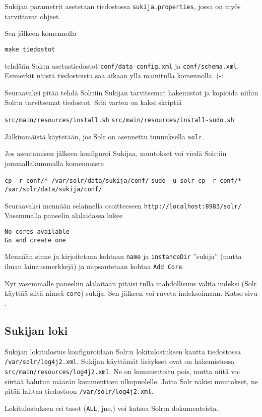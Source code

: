 \documentclass[12pt]{article}
\begin{document}
Sukijan parametrit asetetaan tiedostossa \verb|sukija.properties|,
jossa on myös tarvittavat ohjeet.

Sen jälkeen komennolla

\verb|make tiedostot|

tehdään Solr:n asetustiedostot \verb=conf/data-config.xml= ja
\verb=conf/schema.xml=. Esimerkit näistä tiedostoista
saa aikaan yllä mainitulla komennolla. (-:

Seuraavaksi pitää tehdä Solr:iin Sukijan tarvitsemat hakemistot ja
kopioida niihin Solr:n tarvitsemat tiedostot. Sitä varten on kaksi
skriptiä

\verb=src/main/resources/install.sh=
\verb=src/main/resources/install-sudo.sh=

Jälkimmäistä käytetään, jos Solr on asennettu tunnuksella \verb=solr=.

Jos asentamisen jälkeen konfiguroi Sukijaa, muutokset voi viedä
Solr:iin jommallakummalla komennoista

\verb=cp -r conf/* /var/solr/data/sukija/conf/=
\verb=sudo -u solr cp -r conf/* /var/solr/data/sukija/conf/=


Seuraavaksi mennään selaimella osoitteeseen \verb=http://localhost:8983/solr/=
Vasemmalla paneelin alalaidassa lukee 

\begin{verbatim}
No cores available
Go and create one
\end{verbatim}

Mennään sinne ja kirjoitetaan kohtaan \verb=name= ja \verb=instanceDir=
''sukija'' (mutta ilman lainausmerkkejä) ja napsautetaan kohtaa
\verb=Add Core=.

Nyt vasemmalle paneeliin alalaitaan pitäisi tulla mahdollisuus valita
indeksi (Solr käyttää siitä nimeä \verb=core=) sukija. Sen jälkeen voi
ruveta indeksoimaan. Katso sivu .


\subsection*{Sukijan loki}

Sukijan lokitulostus konfiguroidaan Solr:n lokitulostuksen kautta
tiedostossa \verb=/var/solr/log4j2.xml=. Sukijan käyttämät lisäykset
ovat on hakemistossa \verb=src/main/resources/log4j2.xml=. Ne on
kommentoitu pois, mutta niitä voi siirtää halutun määrän kommenttien
ulkopuolelle. Jotta Solr näkisi muutokset, ne pitää laittaa tiedostoon
\verb=/var/solr/log4j2.xml=.

Lokitulostuksen eri tasot (\verb=ALL=, jne.) voi katsoa Solr:n
dokumenteista.
\end{document}
